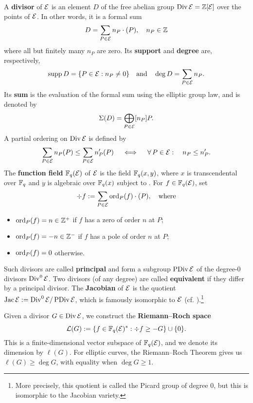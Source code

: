 \documentclass[twocolumn, 11pt]{scrartcl}
\begin{document}
A \textbf{divisor} of $\mathcal{E}$ is an element $D$ of the free abelian group $\operatorname{Div}\mathcal{E}=\mathbb{Z}[\mathcal{E}]$ over the points of $\mathcal{E}$. In other words, it is a formal sum
\[ D=\sum_{P\in\mathcal{E}} n_P\cdot(P),\quad n_P\in\mathbb{Z} \]
where all but finitely many $n_P$ are zero. Its \textbf{support} and \textbf{degree} are, respectively,
\[ \operatorname{supp} D=\{P\in\mathcal{E}:n_P\neq0\} \quad\text{and}\quad \deg D=\sum_{P\in\mathcal{E}} n_P. \]
Its \textbf{sum} is the evaluation of the formal sum using the elliptic group law, and is denoted by
\[ \Sigma(D)=\bigoplus_{P\in\mathcal{E}} [n_P]P. \]
A partial ordering on $\operatorname{Div}\mathcal{E}$ is defined by
\[ \sum_{P\in\mcE} n_P(P)\leq\sum_{P\in\mcE} n'_P(P) \qiff \forall P\in\mcE:\quad n_P\leq n'_P. \]
The \textbf{function field} $\mathbb{F}_q(\mathcal{E})$ of $\mathcal{E}$ is the field $\mathbb{F}_q(x,y)$, where $x$ is transcendental over $\mathbb{F}_q$ and $y$ is algebraic over $\mathbb{F}_q(x)$ subject to . For $f\in\mathbb{F}_q(\mathcal{E})$, set
\[ \div f:=\sum_{P\in\mathcal{E}} \operatorname{ord}_P(f)\cdot(P),\quad\text{where} \]
\begin{itemize}
    \item $\operatorname{ord}_P(f)=n\in\mathbb{Z}^+$ if $f$ has a zero of order $n$ at $P$;
    \item $\operatorname{ord}_P(f)=-n\in\mathbb{Z}^-$ if $f$ has a pole of order $n$ at $P$;
    \item $\operatorname{ord}_P(f)=0$ otherwise.
\end{itemize}
Such divisors are called \textbf{principal} and form a subgroup $\operatorname{PDiv}\mathcal{E}$ of the degree-0 divisors $\operatorname{Div}^0\mathcal{E}$. Two divisors (of any degree) are called \textbf{equivalent} if they differ by a principal divisor. The \textbf{Jacobian} of $\mathcal{E}$ is the quotient $\operatorname{Jac}\mathcal{E}:=\operatorname{Div}^0\mathcal{E}/\operatorname{PDiv}\mathcal{E}$, which is famously isomorphic to $\mathcal{E}$ (cf. ).\footnote{More precisely, this quotient is called the Picard group of degree 0, but this is isomorphic to the Jacobian variety.}

Given a divisor $G\in\operatorname{Div}\mathcal{E}$, we construct the \textbf{Riemann--Roch space}
\[ \mathcal{L}(G):=\{f\in\mathbb{F}_q(\mathcal{E})^*:\div f\geq-G\}\cup\{0\}. \]
This is a finite-dimensional vector subspace of $\mathbb{F}_q(\mathcal{E})$, and we denote its dimension by $\ell(G)$. For elliptic curves, the Riemann--Roch Theorem \cite[\S1.5]{stichtenoth2009algebraic} gives us $\ell(G)\geq\deg G$, with equality when $\deg G\geq1$.
\end{document}
